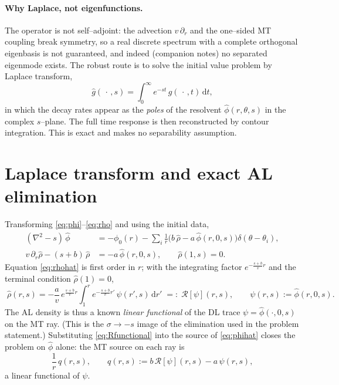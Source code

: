 \documentclass{article}
\newcommand{\rd}{\mathrm{d}}
\begin{document}
\paragraph{Why Laplace, not eigenfunctions.} The operator is not self--adjoint:
the advection $v\,\partial_r$ and the one--sided MT coupling break symmetry, so a
real discrete spectrum with a complete orthogonal eigenbasis is not guaranteed,
and indeed (companion notes) no separated eigenmode exists. The robust route is
to solve the initial value problem by Laplace transform,
\begin{equation}
\widehat g(\,\cdot\,,s)=\int_0^\infty e^{-st}\,g(\,\cdot\,,t)\,\rd t,
\end{equation}
in which the decay rates appear as the \emph{poles} of the resolvent
$\widehat\phi(r,\theta,s)$ in the complex $s$--plane. The full time response is
then reconstructed by contour integration. This is exact and makes no
separability assumption.

\section{Laplace transform and exact AL elimination}

Transforming \eqref{eq:phi}--\eqref{eq:rho} and using the initial data,
\begin{align}
(\nabla^2-s)\,\widehat\phi &= -\phi_0(r)
-\sum_i\frac1r\bigl(b\,\widehat\rho-a\,\widehat\phi(r,0,s)\bigr)\delta(\theta-\theta_i),
\label{eq:phihat}\\
v\,\partial_r\widehat\rho-(s+b)\,\widehat\rho &= -a\,\widehat\phi(r,0,s),
\qquad \widehat\rho(1,s)=0 .
\label{eq:rhohat}
\end{align}
Equation \eqref{eq:rhohat} is first order in $r$; with the integrating factor
$e^{-\frac{s+b}{v}r}$ and the terminal condition $\widehat\rho(1)=0$,
\begin{equation}
\boxed{\;
\widehat\rho(r,s)=-\frac{a}{v}\,e^{\frac{s+b}{v}r}
\int_1^r e^{-\frac{s+b}{v}r'}\,\psi(r',s)\,\rd r'
\;=:\;\mathcal R[\psi](r,s),
\qquad
\psi(r,s):=\widehat\phi(r,0,s).
\;}
\label{eq:Rfunctional}
\end{equation}
The AL density is thus a known \emph{linear functional} of the DL trace
$\psi=\widehat\phi(\cdot,0,s)$ on the MT ray. (This is the $\sigma\to-s$ image of
the elimination used in the problem statement.) Substituting \eqref{eq:Rfunctional}
into the source of \eqref{eq:phihat} closes the problem on $\widehat\phi$ alone:
the MT source on each ray is
\begin{equation}
\frac{1}{r}\,q(r,s),\qquad
q(r,s):=b\,\mathcal R[\psi](r,s)-a\,\psi(r,s),
\label{eq:qdef}
\end{equation}
a linear functional of $\psi$.
\end{document}
